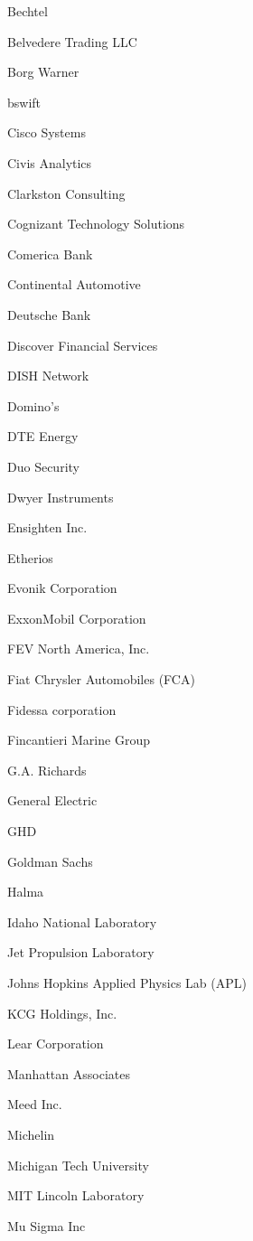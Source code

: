 \documentclass[twoside]{article}
\begin{document}
\begin{center}
\begin{multicols}{5}
\begin{FlushLeft}
\begin{compactitem}
\item Bechtel
\item Belvedere Trading LLC
\item Borg Warner
\item bswift
\item Cisco Systems
\item Civis Analytics
\item Clarkston Consulting
\item Cognizant Technology Solutions
\item Comerica Bank
\item Continental Automotive
\item Deutsche Bank
\item Discover Financial Services
\item DISH Network
\item Domino's
\item DTE Energy
\item Duo Security
\item Dwyer Instruments
\item Ensighten Inc.
\item Etherios
\item Evonik Corporation
\item ExxonMobil Corporation
\item FEV North America, Inc.
\item Fiat Chrysler Automobiles (FCA)
\item Fidessa corporation
\item Fincantieri Marine Group
\item G.A. Richards
\item General Electric
\item GHD
\item Goldman Sachs
\item Halma
\item Idaho National Laboratory
\item Jet Propulsion Laboratory
\item Johns Hopkins Applied Physics Lab (APL)
\item KCG Holdings, Inc.
\item Lear Corporation
\item Manhattan Associates
\item Meed Inc.
\item Michelin
\item Michigan Tech University
\item MIT Lincoln Laboratory
\item Mu Sigma Inc

\end{compactitem}
\end{FlushLeft}
\end{multicols}
\end{center}
\end{document}

